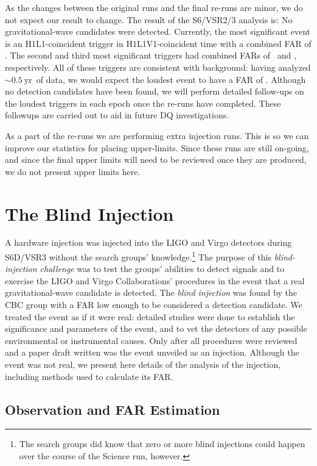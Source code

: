 As the changes between the original runs and the final re-runs are minor, we do
not expect our result to change. The result of the S6/VSR2/3 analysis is: No
gravitational-wave candidates were detected. Currently, the most significant
event is an H1L1-coincident trigger in H1L1V1-coincident time with a combined
FAR of \firstFAR. The second and third most significant triggers had combined
FARs of \secondFAR~and \thirdFAR, respectively. All of these triggers are
consistent with background: having analyzed $\mathrm{\sim0.5~yr}$~of data, we
would expect the loudest event to have a FAR of \expectedLoudestFAR. Although
no detection candidates have been found, we will perform detailed follow-ups on
the loudest triggers in each epoch once the re-runs have completed. These
followups are carried out to aid in future \ac{DQ} investigations.

As a part of the re-runs we are performing extra injection runs. This is so we
can improve our statistics for placing upper-limits. Since these runs are still
on-going, and since the final upper limits will need to be reviewed once they
are produced, we do not present upper limits here.

\section{The Blind Injection}
\label{sec:s6_results_and_big_dog}

A hardware injection was injected into the \ac{LIGO} and Virgo detectors during
S6D/VSR3 without the search groups' knowledge.\footnote{The search groups did
know that zero or more blind injections could happen over the course of
the Science run, however.} The purpose of this \emph{blind-injection challenge}
was to test the groups' abilities to detect signals and to exercise the LIGO
and Virgo Collaborations' procedures in the event that a real
gravitational-wave candidate is detected. The {\it blind injection} was found
by the \ac{CBC} group with a FAR low enough to be considered a detection
candidate. We treated the event as if it were real: detailed studies were done
to establish the significance and parameters of the event, and to vet the
detectors of any possible environmental or instrumental causes. Only after all
procedures were reviewed and a paper draft written was the event unveiled as an
injection.  Although the event was not real, we present here details of the
analysis of the injection, including methods used to calculate its \ac{FAR}.

\subsection{Observation and FAR Estimation}

